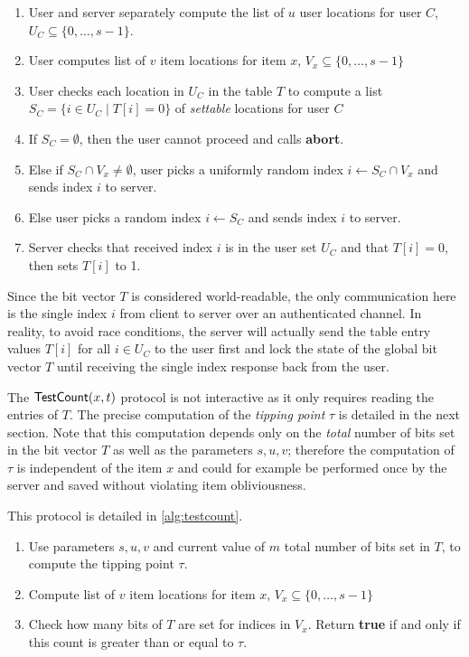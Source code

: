 
\begin{algorithm}[htbp!]
    \caption{$\Increment(x,C)$\label{alg:increment}}
\begin{enumerate}
    \item User and server separately compute the list of $u$ user locations for user $C$, $U_C \subseteq \{0,\ldots,s-1\}$.
    \item User computes list of $v$ item locations for item $x$,
   $V_x \subseteq \{0,\ldots,s-1\}$
   \item User checks each location in $U_C$ in the table $T$ to compute a list $S_C = \{i\in U_C \mid T[i] = 0\}$ of \emph{settable} locations for user $C$
   \item If $S_C = \emptyset$, then the user cannot proceed and calls \textbf{abort}.
   \item Else if $S_C \cap V_x \ne \emptyset$, user picks a uniformly random index $i\gets S_C \cap V_x$ and sends index $i$ to server.
   \item Else user picks a random index $i\gets S_C$ and sends index $i$ to server.
   \item Server checks that received index $i$ is in the user set $U_C$ and that $T[i] = 0$, then sets $T[i]$ to 1.
\end{enumerate}
\end{algorithm}

Since the bit vector $T$ is considered world-readable, the only communication here is the single index $i$ from client to server over an authenticated channel. In reality, to avoid race conditions, the server will actually send the table entry values $T[i]$ for all $i\in U_C$ to the user first and lock the state of the global bit vector $T$ until receiving the single index response back from the user.

The $\TestCount(x,t)$ protocol is not interactive as it only requires reading the entries of $T$. The precise computation of the \emph{tipping point} $\tau$ is detailed in the next section. Note that this computation depends only on the \emph{total} number of bits set in the bit vector $T$ as well as the parameters $s,u,v$; therefore the computation of $\tau$ is independent of the item $x$ and could for example be performed once by the server and saved without violating item obliviousness.

This protocol is detailed in \cref{alg:testcount}.

\begin{algorithm}[htp!]
    \caption{$\TestCount(x,t)$\label{alg:testcount}}
\begin{enumerate}
    \item Use parameters $s,u,v$ and current value of $m$ total number of bits set in $T$, to compute the tipping point $\tau$.
    \item Compute list of $v$ item locations for item $x$, $V_x \subseteq \{0,\ldots,s-1\}$
    \item Check how many bits of $T$ are set for indices in $V_x$. Return \textbf{true} if and only if this count is greater than or equal to $\tau$.
\end{enumerate}
\end{algorithm}

